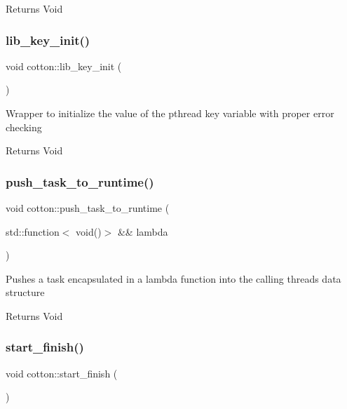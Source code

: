 \begin{DoxyReturn}{Returns}
Void 
\end{DoxyReturn}
\mbox{\label{namespacecotton_a4ea9036584fa3bd86fe8626dc05d295f}} 
\subsubsection{\texorpdfstring{lib\+\_\+key\+\_\+init()}{lib\_key\_init()}}
{\footnotesize\ttfamily void cotton\+::lib\+\_\+key\+\_\+init (\begin{DoxyParamCaption}{ }\end{DoxyParamCaption})}

Wrapper to initialize the value of the pthread key variable with proper error checking

\begin{DoxyReturn}{Returns}
Void 
\end{DoxyReturn}
\mbox{\label{namespacecotton_a2b2001813bd051cd1ff41a75989667c0}} 
\subsubsection{\texorpdfstring{push\+\_\+task\+\_\+to\+\_\+runtime()}{push\_task\_to\_runtime()}}
{\footnotesize\ttfamily void cotton\+::push\+\_\+task\+\_\+to\+\_\+runtime (\begin{DoxyParamCaption}\item[{std\+::function$<$ void()$>$ \&\&}]{lambda }\end{DoxyParamCaption})}

Pushes a task encapsulated in a lambda function into the calling thread\textquotesingle{}s data structure

\begin{DoxyReturn}{Returns}
Void 
\end{DoxyReturn}
\mbox{\label{namespacecotton_aae085573bf6951565449c429ac59c43c}} 
\subsubsection{\texorpdfstring{start\+\_\+finish()}{start\_finish()}}
{\footnotesize\ttfamily void cotton\+::start\+\_\+finish (\begin{DoxyParamCaption}{ }\end{DoxyParamCaption})}

